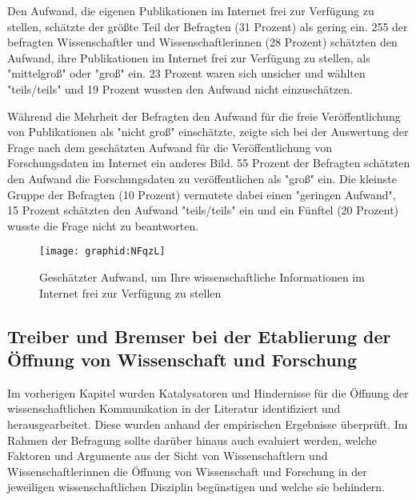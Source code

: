 Den Aufwand, die eigenen Publikationen im Internet frei zur Verfügung zu stellen, schätzte der größte Teil der Befragten (31 Prozent) als gering ein. 255 der befragten Wissenschaftler und Wissenschaftlerinnen (28 Prozent) schätzten den Aufwand, ihre Publikationen im Internet frei zur Verfügung zu stellen, als "mittelgroß" oder "groß" ein. 23 Prozent waren sich unsicher und wählten "teils/teils" und 19 Prozent wussten den Aufwand nicht einzuschätzen.

Während die Mehrheit der Befragten den Aufwand für die freie Veröffentlichung von Publikationen als "nicht groß" einschätzte, zeigte sich bei der Auswertung der Frage nach dem geschätzten Aufwand für die Veröffentlichung von Forschungsdaten im Internet ein anderes Bild. 55 Prozent der Befragten schätzten den Aufwand die Forschungsdaten zu veröffentlichen als "groß" ein. Die kleinste Gruppe der Befragten (10 Prozent) vermutete dabei einen "geringen Aufwand", 15 Prozent schätzten den Aufwand "teils/teils" ein und ein Fünftel (20 Prozent) wusste die Frage nicht zu beantworten.

\begin{figure}[h!]
\texttt{[image: graphid:NFqzL]}
\caption{Geschätzter Aufwand, um Ihre wissenschaftliche Informationen im Internet frei zur Verfügung zu stellen}
\end{figure}

\subsection{Treiber und Bremser bei der Etablierung der Öffnung von Wissenschaft und Forschung}

Im vorherigen Kapitel wurden Katalysatoren und Hindernisse für die Öffnung der wissenschaftlichen Kommunikation in der Literatur identifiziert und herausgearbeitet. Diese wurden anhand der empirischen Ergebnisse überprüft. Im Rahmen der Befragung sollte darüber hinaus auch evaluiert werden, welche Faktoren und Argumente aus der Sicht von Wissenschaftlern und Wissenschaftlerinnen die Öffnung von Wissenschaft und Forschung in der jeweiligen wissenschaftlichen Disziplin begünstigen und welche sie behindern.

